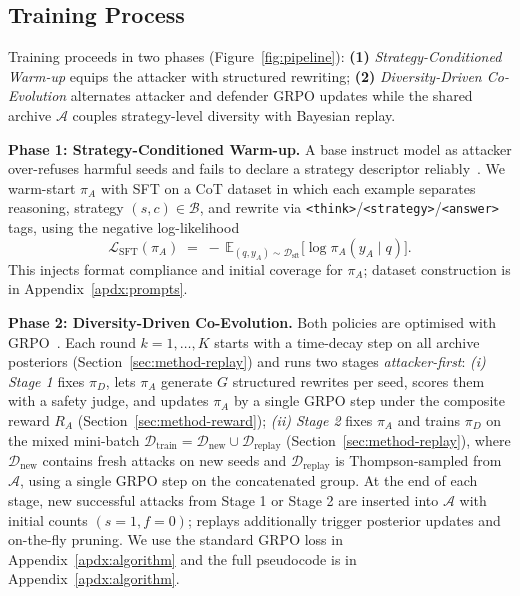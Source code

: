 \documentclass{article}
\newcommand{\piA}{\pi_A}
\newcommand{\piD}{\pi_D}
\newcommand{\archive}{\mathcal{A}}
\newcommand{\strategyspace}{\mathcal{B}}
\begin{document}
\subsection{Training Process}
\label{sec:method-training}

Training proceeds in two phases (Figure~\ref{fig:pipeline}): \textbf{(1)} \emph{Strategy-Conditioned Warm-up} equips the attacker with structured rewriting; \textbf{(2)} \emph{Diversity-Driven Co-Evolution} alternates attacker and defender GRPO updates while the shared archive $\archive$ couples strategy-level diversity with Bayesian replay.

\textbf{Phase 1: Strategy-Conditioned Warm-up.}\quad
A base instruct model as attacker over-refuses harmful seeds and fails to declare a strategy descriptor reliably~\citep{magic2025}. We warm-start $\piA$ with SFT on a CoT dataset in which each example separates reasoning, strategy $(s,c)\in\strategyspace$, and rewrite via \texttt{<think>}/\texttt{<strategy>}/\texttt{<answer>} tags, using the negative log-likelihood
\begin{equation}
  \mathcal{L}_{\text{SFT}}(\piA) \;=\; -\,\mathbb{E}_{(q, y_A) \sim \mathcal{D}_{\text{sft}}}\bigl[\log \piA(y_A \mid q)\bigr].
\end{equation}
This injects format compliance and initial coverage for $\piA$; dataset construction is in Appendix~\ref{apdx:prompts}.

\textbf{Phase 2: Diversity-Driven Co-Evolution.}\quad
Both policies are optimised with GRPO~\citep{shao2024grpo, guo2025deepseek}. Each round $k=1,\dots,K$ starts with a time-decay step on all archive posteriors (Section~\ref{sec:method-replay}) and runs two stages \emph{attacker-first}: \textit{(i) Stage 1} fixes $\piD$, lets $\piA$ generate $G$ structured rewrites per seed, scores them with a safety judge, and updates $\piA$ by a single GRPO step under the composite reward $R_A$ (Section~\ref{sec:method-reward}); \textit{(ii) Stage 2} fixes $\piA$ and trains $\piD$ on the mixed mini-batch $\mathcal{D}_{\mathrm{train}}=\mathcal{D}_{\mathrm{new}}\cup\mathcal{D}_{\mathrm{replay}}$ (Section~\ref{sec:method-replay}), where $\mathcal{D}_{\mathrm{new}}$ contains fresh attacks on new seeds and $\mathcal{D}_{\mathrm{replay}}$ is Thompson-sampled from $\archive$, using a single GRPO step on the concatenated group. At the end of each stage, new successful attacks from Stage 1 or Stage 2 are inserted into $\archive$ with initial counts $(s{=}1, f{=}0)$; replays additionally trigger posterior updates and on-the-fly pruning. We use the standard GRPO loss in Appendix~\ref{apdx:algorithm} and the full pseudocode is in Appendix~\ref{apdx:algorithm}.
\end{document}
